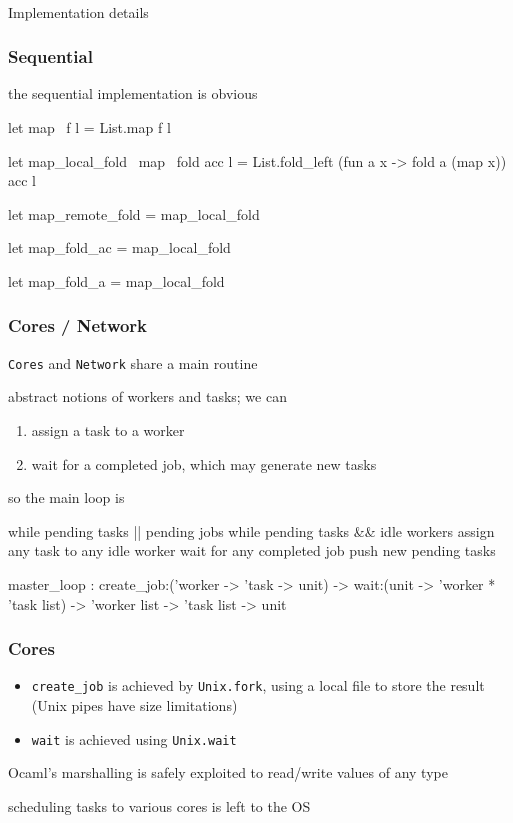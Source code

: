 \documentclass{beamer}
\let\emph\alert
\begin{document}
\begin{frame}
  \begin{center}
    \hrulefill\\
    \emph{Implementation details}
  \end{center}
\end{frame}

\begin{frame}\frametitle{Sequential}
the sequential implementation is obvious

  \begin{ocaml}
let map ~f l = List.map f l

let map_local_fold ~map ~fold acc l =
  List.fold_left (fun a x -> fold a (map x)) acc l

let map_remote_fold = map_local_fold

let map_fold_ac = map_local_fold

let map_fold_a = map_local_fold
  \end{ocaml}
\end{frame}

\begin{frame}\frametitle{Cores / Network}

  \texttt{Cores} and \texttt{Network} share a main routine

  abstract notions of \emph{workers} and \emph{tasks}; we can
  \begin{enumerate}
  \item assign a task to a worker
  \item wait for a completed job, which may generate new tasks
  \end{enumerate}


  so the main loop is
  \begin{lightblue-tt}
    while pending tasks || pending jobs
      while pending tasks && idle workers
        assign any task to any idle worker
      wait for any completed job
        push new pending tasks
  \end{lightblue-tt}


  \begin{ocaml}
master_loop : 
  create_job:('worker -> 'task -> unit) -> 
  wait:(unit -> 'worker * 'task list) -> 
  'worker list -> 'task list -> unit
  \end{ocaml}
\end{frame}

\begin{frame}\frametitle{Cores}
  \begin{itemize}\item 
    \texttt{create\_job} is achieved by \texttt{Unix.fork}, using a
    local file to store the result (Unix pipes have size limitations)

  \item 
    \texttt{wait} is achieved using \texttt{Unix.wait}
  \end{itemize}



  Ocaml's marshalling is safely exploited to read/write values of any type


  scheduling tasks to various cores is left to the OS
\end{frame}
\end{document}
